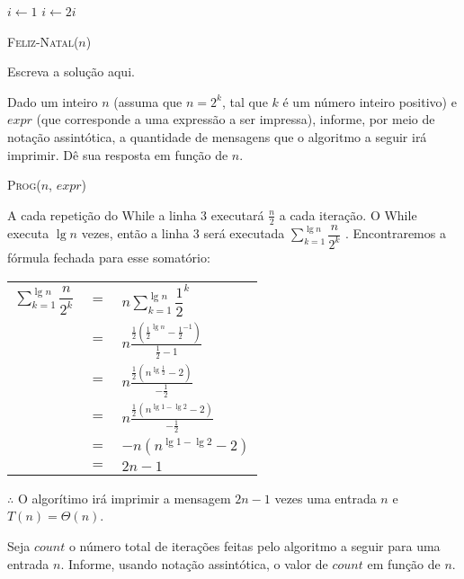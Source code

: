\documentclass[a4paper]{exam}
\begin{document}
\begin{questions}
  \begin{algorithm}[H]
    \NoCaptionOfAlgo
    \DontPrintSemicolon

    $i \leftarrow 1$\;
     {
      $i \leftarrow 2i$\;
    }
    \caption{\textsc{Feliz-Natal}($n$)}
  \end{algorithm}
  \begin{solution}
    Escreva a solução aqui.
  \end{solution}
  \question Dado um inteiro $n$ (assuma que $n=2^k$, tal que
  $k$ é um número inteiro positivo) e $expr$ (que corresponde a uma
  expressão a ser impressa), informe, por meio de notação assintótica,
  a quantidade de mensagens que o algoritmo a seguir irá
  imprimir. Dê sua resposta em função de $n$.

  \begin{algorithm}[H]
    \NoCaptionOfAlgo
    \DontPrintSemicolon

    \caption{\textsc{Prog}($n$, $expr$)}
  \end{algorithm}
  \begin{solution}
    A cada repetição do While a linha 3 executará $\frac{n}{2}$ a cada iteração. O While executa $\lg n$ vezes,
    então a linha 3 será executada $\displaystyle\sum_{k=1}^{\lg n} \dfrac{n}{2^k}$ . Encontraremos a fórmula fechada
    para esse somatório:\\
    \begin{tabular}{lll}
      $ \displaystyle\sum_{k=1}^{\lg n} \dfrac{n}{2^k} $&  $=$ &$ n\displaystyle\sum_{k=1}^{\lg n} {\dfrac{1}{2}}^k $ \\
      {}& $=$ &$ n\frac{\frac{1}{2}({\frac{1}{2}}^{\lg n} - {\frac{1}{2}}^{-1})}{\frac{1}{2} - 1}$ \\
      {}& $=$ &$ n\frac{\frac{1}{2}({n}^{\lg {\frac{1}{2}}} - {2})}{-\frac{1}{2}}$ \\
      {}& $=$ &$ n\frac{\frac{1}{2}({n}^{\lg 1 - \lg 2} - {2})}{-\frac{1}{2}}$ \\
      {}& $=$ &$ -n({n^{{\lg 1} - {\lg 2}}} - 2)$ \\
      {}& $=$ &$ 2n -1$ \\
    \end{tabular}

    $\therefore$ O algorítimo irá imprimir a mensagem $2n-1$ vezes uma entrada $n$ e $T(n)= \Theta(n)$.
  \end{solution}
  \question Seja $count$ o número total de iterações feitas pelo
  algoritmo a seguir para uma entrada $n$. Informe, usando
  notação assintótica, o valor de $count$ em função de $n$.


\end{questions}
\end{document}
